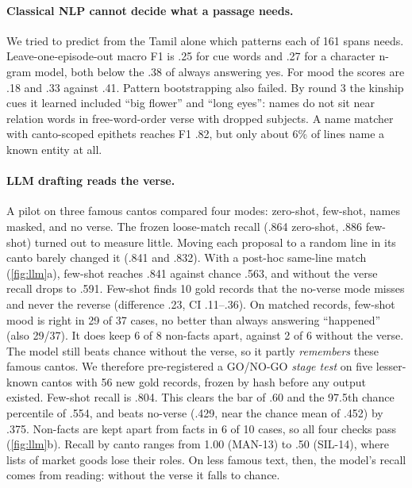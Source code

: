 \documentclass[11pt]{article}
\begin{document}
\paragraph{Classical NLP cannot decide what a passage needs.} We tried to predict from the Tamil alone which patterns each of 161 spans needs. Leave-one-episode-out macro F1 is .25 for cue words and .27 for a character n-gram model, both below the .38 of always answering yes. For mood the scores are .18 and .33 against .41. Pattern bootstrapping \citep{Agichtein2000SnowballExtracting,Batista2015SemisupervisedBootstrapping} also failed. By round 3 the kinship cues it learned included ``big flower'' and ``long eyes'': names do not sit near relation words in free-word-order verse with dropped subjects. A name matcher with canto-scoped epithets reaches F1 .82, but only about 6\% of lines name a known entity at all.

\paragraph{LLM drafting reads the verse.} A pilot on three famous cantos compared four modes: zero-shot, few-shot, names masked, and no verse. The frozen loose-match recall (.864 zero-shot, .886 few-shot) turned out to measure little. Moving each proposal to a random line in its canto barely changed it (.841 and .832). With a post-hoc same-line match (\cref{fig:llm}a), few-shot reaches .841 against chance .563, and without the verse recall drops to .591. Few-shot finds 10 gold records that the no-verse mode misses and never the reverse (difference .23, CI .11--.36). On matched records, few-shot mood is right in 29 of 37 cases, no better than always answering ``happened'' (also 29/37). It does keep 6 of 8 non-facts apart, against 2 of 6 without the verse. The model still beats chance without the verse, so it partly \emph{remembers} these famous cantos. We therefore pre-registered a GO/NO-GO \emph{stage test} on five lesser-known cantos with 56 new gold records, frozen by hash before any output existed. Few-shot recall is .804. This clears the bar of .60 and the 97.5th chance percentile of .554, and beats no-verse (.429, near the chance mean of .452) by .375. Non-facts are kept apart from facts in 6 of 10 cases, so all four checks pass (\cref{fig:llm}b). Recall by canto ranges from 1.00 (MAN-13) to .50 (SIL-14), where lists of market goods lose their roles. On less famous text, then, the model's recall comes from reading: without the verse it falls to chance.
\end{document}

